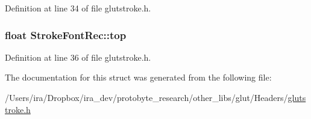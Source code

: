 Definition at line 34 of file glutstroke.\-h.

\hypertarget{struct_stroke_font_rec_a279e56b7237add8c30e49c83c1be883a}{
\subsubsection[{top}]{\setlength{\rightskip}{0pt plus 5cm}float Stroke\-Font\-Rec\-::top}}\label{struct_stroke_font_rec_a279e56b7237add8c30e49c83c1be883a}


Definition at line 36 of file glutstroke.\-h.



The documentation for this struct was generated from the following file\-:\begin{DoxyCompactItemize}
\item 
/\-Users/ira/\-Dropbox/ira\-\_\-dev/protobyte\-\_\-research/other\-\_\-libs/glut/\-Headers/\hyperlink{glutstroke_8h}{glutstroke.\-h}\end{DoxyCompactItemize}

